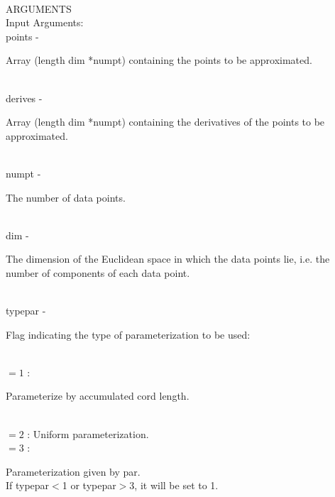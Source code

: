 \\
ARGUMENTS\\
        \>Input Arguments:\\
        \>\>    {\fov points}   \> - \> \begin{minipg2}
                                Array (length dim *numpt) containing the points to be
                                approximated.
                                \end{minipg2}\\[0.3ex]
        \>\>    {\fov derives}  \> - \> \begin{minipg2}
                                Array (length dim *numpt) containing
                                the derivatives
                                of the points to be
                                approximated.
                                \end{minipg2}\\[0.3ex]
        \>\>    {\fov numpt}    \> - \> \begin{minipg2}
                                The number of data points.
                                \end{minipg2}\\
        \>\>    {\fov dim}      \> - \> \begin{minipg2}
                                The dimension of the Euclidean space in which the
                                data points lie, i.e. the number of components of
                                each data point.
                                \end{minipg2}\\
        \>\>    {\fov typepar}  \> - \> \begin{minipg2}
                                Flag indicating the type of parameterization to be
                                        used:
                                \end{minipg2}\\[0.8ex]
                \>\>\>\>\>      $=1$ :\> \begin{minipg5}
                                        Parameterize by accumulated cord length.
                                \end{minipg5}\\[0.3ex]
                \>\>\>\>\>      $=2$ :\> Uniform parameterization.\\
                \>\>\>\>\>      $=3$ :\> \begin{minipg5}
                                        Parameterization given by {\fov par}.\\
                                        If typepar$<$1 or typepar$>$3, it
                                        will be set to 1.
                                        \end{minipg5}\\[0.8ex]
